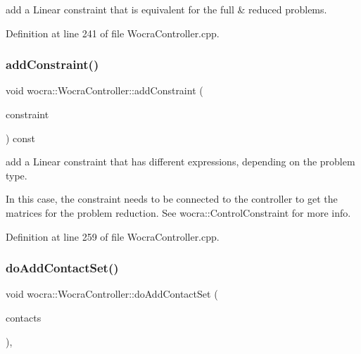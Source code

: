 add a Linear constraint that is equivalent for the full \& reduced problems. 

Definition at line 241 of file Wocra\+Controller.\+cpp.

\hypertarget{classwocra_1_1WocraController_af6db65f470668d19bb7fd24821f042db}{}\label{classwocra_1_1WocraController_af6db65f470668d19bb7fd24821f042db} 
\subsubsection{\texorpdfstring{add\+Constraint()}{addConstraint()}\hspace{0.1cm}{\footnotesize\ttfamily [2/2]}}
{\footnotesize\ttfamily void wocra\+::\+Wocra\+Controller\+::add\+Constraint (\begin{DoxyParamCaption}\item[{\hyperlink{classocra_1_1ControlConstraint}{ocra\+::\+Control\+Constraint} \&}]{constraint }\end{DoxyParamCaption}) const}

add a Linear constraint that has different expressions, depending on the problem type.

In this case, the constraint needs to be connected to the controller to get the matrices for the problem reduction. See wocra\+::\+Control\+Constraint for more info. 

Definition at line 259 of file Wocra\+Controller.\+cpp.

\hypertarget{classwocra_1_1WocraController_a74d8fa3103ca3787add351620c5bcf73}{}\label{classwocra_1_1WocraController_a74d8fa3103ca3787add351620c5bcf73} 
\subsubsection{\texorpdfstring{do\+Add\+Contact\+Set()}{doAddContactSet()}}
{\footnotesize\ttfamily void wocra\+::\+Wocra\+Controller\+::do\+Add\+Contact\+Set (\begin{DoxyParamCaption}\item[{const \hyperlink{classocra_1_1ContactSet}{Contact\+Set} \&}]{contacts }\end{DoxyParamCaption})\hspace{0.3cm}{\ttfamily [protected]}, {\ttfamily [virtual]}}

